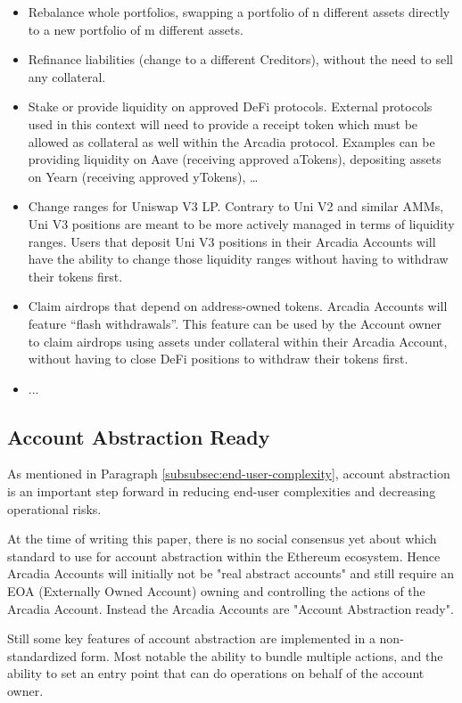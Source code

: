 \documentclass[sigconf,nonacm]{acmart}
\begin{document}
\begin{itemize}
    \item Rebalance whole portfolios, swapping a portfolio of n different assets directly to a new portfolio of m different assets.
    \item Refinance liabilities (change to a different Creditors), without the need to sell any collateral.
    \item Stake or provide liquidity on approved DeFi protocols.
    External protocols used in this context will need to provide a receipt token which must be allowed as collateral as well within the Arcadia protocol.
    Examples can be providing liquidity on Aave (receiving approved aTokens), depositing assets on Yearn (receiving approved yTokens), …
    \item Change ranges for Uniswap V3 LP. Contrary to Uni V2 and similar AMMs, Uni V3 positions are meant to be more actively managed in terms of liquidity ranges.
    Users that deposit Uni V3 positions in their Arcadia Accounts will have the ability to change those liquidity ranges without having to withdraw their tokens first.
    \item Claim airdrops that depend on address-owned tokens. Arcadia Accounts will feature “flash withdrawals”.
    This feature can be used by the Account owner to claim airdrops using assets under collateral within their Arcadia Account, without having to close DeFi positions to withdraw their tokens first.
    \item ...
\end{itemize}

\subsection{Account Abstraction Ready}
\label{subsec:account-abstraction-ready}
As mentioned in Paragraph \ref{subsubsec:end-user-complexity}, account abstraction is an important step forward in reducing end-user complexities and decreasing operational risks.

At the time of writing this paper, there is no social consensus yet about which standard to use for account abstraction within the Ethereum ecosystem.
Hence Arcadia Accounts will initially not be "real abstract accounts" and still require an EOA (Externally Owned Account) owning and controlling the actions of the Arcadia Account.
Instead the Arcadia Accounts are "Account Abstraction ready".

Still some key features of account abstraction are implemented in a non-standardized form.
Most notable the ability to bundle multiple actions, and the ability to set an entry point that can do operations on behalf of the account owner.
\end{document}
